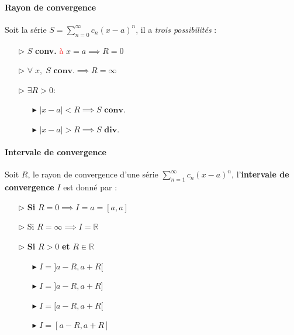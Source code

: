 \documentclass{report}
\begin{document}
\begin{multicols*}{3}
  \paragraph{Rayon de convergence}
  Soit la série $S = \sum_{n=0}^{\infty }c_n(x - a)^n$, il a 
  \textit{trois possibilités} :   
  \begin{itemize}
    \item [$\rhd$ ] $S$ \textbf{conv.} \textcolor{red}{à}   
           $x = a \implies  R = 0$  
    \item [$\rhd$ ] $\forall \; x, \; S \textbf{ conv.} \implies  
                 R = \infty$       
    \item [$\rhd$ ] $\exists R > 0 \colon $ 
        \begin{itemize}
          \item [$\blacktriangleright$ ] $|x - a| < R \implies 
            S \textbf{ conv.}  $ 
          \item [$\blacktriangleright$ ] $|x - a| > R \implies 
            S \textbf{ div.}$ 
        \end{itemize}
  \end{itemize}

  \paragraph{Intervale de convergence}
  Soit $R$, le rayon de convergence d'une série 
  $\sum_{n=1}^{\infty }c_n(x - a)^n$,  
  l'\textbf{intervale de convergence} $I$ est donné par : 
  \begin{itemize}
    \item [$\rhd$ ]\textbf{Si}  $R = 0 \implies  I = a = [a, a]$
    \item [$\rhd$ ] Si $R = \infty \implies  I = \mathbb{R} $
    \item [$\rhd$ ] \textbf{Si} $R > 0$ \textbf{et} $R \in \mathbb{R}$    
      \begin{itemize}
        \item [$\blacktriangleright$ ] $I = ]a - R, a + R[$
        \item [$\blacktriangleright$ ] $I = ]a - R, a + R]$
        \item [$\blacktriangleright$ ] $I = [ a - R, a + R[$
        \item [$\blacktriangleright$ ] $I = [ a - R, a + R] $
      \end{itemize}
  \end{itemize}


\end{multicols*}
\end{document}

